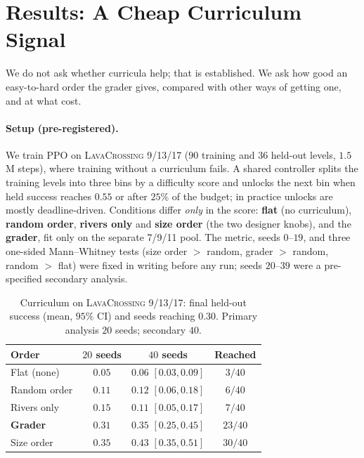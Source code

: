 \documentclass[twoside]{article}
\begin{document}
\section{Results: A Cheap Curriculum Signal}
\label{sec:results-curriculum-v2}
\label{sec:results-curriculum-neural}

We do not ask whether curricula help; that is established. We ask how good an easy-to-hard order the grader gives, compared with other ways of getting one, and at what cost.

\paragraph{Setup (pre-registered).} We train PPO on \textsc{LavaCrossing} 9/13/17 ($90$ training and $36$ held-out levels, $1.5$M steps), where training without a curriculum fails. A shared controller splits the training levels into three bins by a difficulty score and unlocks the next bin when held success reaches $0.55$ or after $25\%$ of the budget; in practice unlocks are mostly deadline-driven. Conditions differ \emph{only} in the score: \textbf{flat} (no curriculum), \textbf{random order}, \textbf{rivers only} and \textbf{size order} (the two designer knobs), and the \textbf{grader}, fit only on the separate 7/9/11 pool. The metric, seeds $0$--$19$, and three one-sided Mann--Whitney tests (size order $>$ random, grader $>$ random, random $>$ flat) were fixed in writing before any run; seeds $20$--$39$ were a pre-specified secondary analysis.

\begin{table}[t]
\centering
\small
\caption{Curriculum on \textsc{LavaCrossing} 9/13/17: final held-out success (mean, $95\%$ CI) and seeds reaching $0.30$. Primary analysis $20$ seeds; secondary $40$.}
\label{tab:curriculum-v2}
\setlength{\tabcolsep}{3pt}
\begin{tabular}{lccc}
\toprule
Order & $20$ seeds & $40$ seeds & Reached \\
\midrule
Flat (none)   & $0.05$ & $0.06$ $[0.03,0.09]$ & $3/40$ \\
Random order  & $0.11$ & $0.12$ $[0.06,0.18]$ & $6/40$ \\
Rivers only   & $0.15$ & $0.11$ $[0.05,0.17]$ & $7/40$ \\
\textbf{Grader} & $\mathbf{0.31}$ & $\mathbf{0.35}$ $[0.25,0.45]$ & $23/40$ \\
Size order    & $0.35$ & $0.43$ $[0.35,0.51]$ & $30/40$ \\
\bottomrule
\end{tabular}
\end{table}
\end{document}
